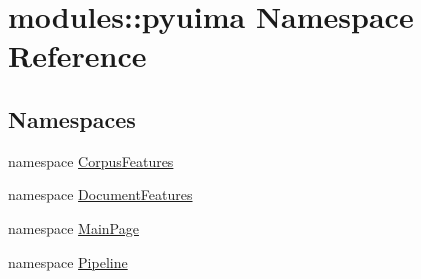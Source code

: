 \hypertarget{namespacemodules_1_1pyuima}{\section{modules\-:\-:pyuima \-Namespace \-Reference}
\label{namespacemodules_1_1pyuima}
}
\subsection*{\-Namespaces}
\begin{DoxyCompactItemize}
\item 
namespace \hyperlink{namespacemodules_1_1pyuima_1_1CorpusFeatures}{\-Corpus\-Features}
\item 
namespace \hyperlink{namespacemodules_1_1pyuima_1_1DocumentFeatures}{\-Document\-Features}
\item 
namespace \hyperlink{namespacemodules_1_1pyuima_1_1MainPage}{\-Main\-Page}
\item 
namespace \hyperlink{namespacemodules_1_1pyuima_1_1Pipeline}{\-Pipeline}
\end{DoxyCompactItemize}
